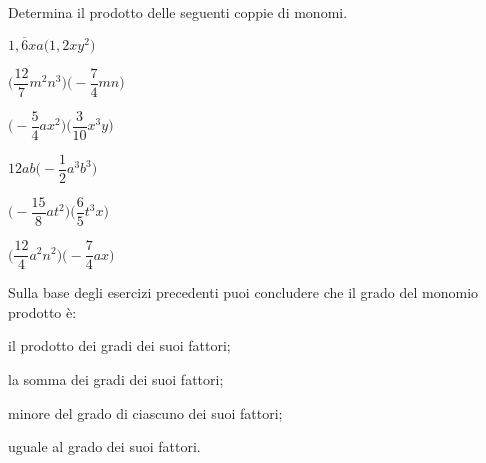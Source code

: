 \begin{esercizio}
 \label{ese:9.15}
Determina il prodotto delle seguenti coppie di monomi.
\begin{multicols}{3}
\begin{enumeratea}
 \item $1,\overline{6}xa\big(1,2xy^{2}\big)$
 \item $\bigg(\dfrac{12}{7}m^{2}n^{3}\bigg)\bigg(-{\dfrac{7}{4}}mn\bigg)$
 \item $\bigg(-{\dfrac{5}{4}}ax^{2}\bigg)\bigg(\dfrac{3}{10}x^{3}y\bigg)$
 \item $12ab\bigg(-{\dfrac{1}{2}}a^{3}b^{3}\bigg)$
 \item $\bigg(-{\dfrac{15}{8}}at^{2}\bigg)\bigg(\dfrac{6}{5}t^{3}x\bigg)$
 \item $\bigg(\dfrac{12}{4}a^{2}n^{2}\bigg)\bigg(-{\dfrac{7}{4}}ax\bigg)$
\end{enumeratea}
\end{multicols}
\end{esercizio}


\begin{esercizio}
 \label{ese:9.16}
Sulla base degli esercizi precedenti puoi concludere che il grado del monomio 
prodotto è:

\begin{enumeratea}
 \item il prodotto dei gradi dei suoi fattori;
 \item la somma dei gradi dei suoi fattori;
 \item minore del grado di ciascuno dei suoi fattori;
 \item uguale al grado dei suoi fattori.
\end{enumeratea}
\end{esercizio}

\subsubsection*{}

